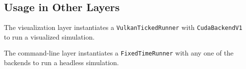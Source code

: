 



\subsection{Usage in Other Layers}
The visualization layer instantiates a \texttt{VulkanTickedRunner} with \texttt{CudaBackendV1} to run a visualized simulation.

The command-line layer instantiates a \texttt{FixedTimeRunner} with any one of the backends to run a headless simulation.